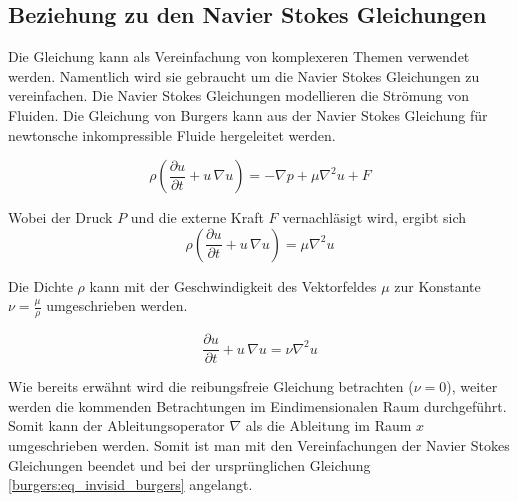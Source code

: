 	
	\subsection{Beziehung zu den Navier Stokes Gleichungen}
		Die Gleichung kann als Vereinfachung von komplexeren Themen verwendet werden.
		Namentlich wird sie gebraucht um die Navier Stokes Gleichungen zu vereinfachen.
		Die Navier Stokes Gleichungen modellieren die Str\"omung von Fluiden.
		Die Gleichung von Burgers kann aus der Navier Stokes Gleichung f\"ur newtonsche inkompressible Fluide hergeleitet werden. \cite{burgers:navier}
		
		
		\begin{equation}
			\rho \left(\frac{\partial u}{\partial t} + u \, \nabla u \right) = -\nabla p + \mu \nabla^2 u + F 	
			\label{burgers:eq_navier}
		\end{equation}
		
		Wobei der Druck $P$ und die externe Kraft $F$ vernachl\"asigt wird, ergibt sich
		\begin{equation}
			\rho \left(\frac{\partial u}{\partial t} + u \, \nabla u \right) = \mu \nabla^2 u
			 \label{burgers:eq_navier2}
		\end{equation}
		
		Die Dichte $\rho$ kann mit der Geschwindigkeit des Vektorfeldes $\mu$ zur Konstante $\nu = \frac{\mu}{\rho}$ umgeschrieben werden.
		
		\begin{equation}
			 \frac{\partial u}{\partial t} + u \,\nabla u = \nu \nabla^2 u 
			 \label{burgers:eq_navier3}
		\end{equation}
		
		Wie bereits erw\"ahnt wird die reibungsfreie Gleichung betrachten ($\nu = 0$), weiter werden die kommenden Betrachtungen im Eindimensionalen Raum durchgef\"uhrt.
		Somit kann der Ableitungsoperator $\nabla$ als die Ableitung im Raum $x$ umgeschrieben werden.
		Somit ist man mit den Vereinfachungen der Navier Stokes Gleichungen beendet und bei der urspr\"unglichen Gleichung \eqref{burgers:eq_invisid_burgers} angelangt.
	
		
